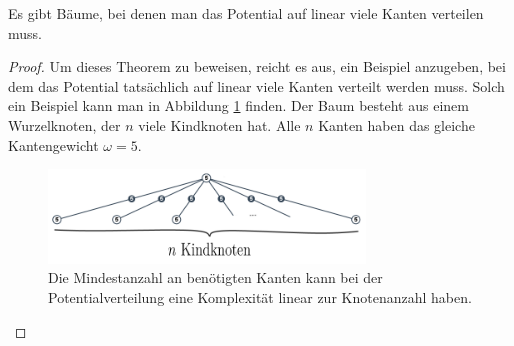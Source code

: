 \begin{theorem}\label{theorem_pot_auf_linear_vielen_kanten}
	Es gibt Bäume, bei denen man das Potential auf linear viele Kanten verteilen muss.
\end{theorem}	
\begin{proof}
	Um dieses Theorem zu beweisen, reicht es aus, ein Beispiel anzugeben, bei dem das Potential tatsächlich auf linear viele Kanten verteilt werden muss. Solch ein Beispiel kann man in Abbildung \ref{abb_bsp_potverteilen} finden. Der Baum besteht aus einem Wurzelknoten, der $n$ viele Kindknoten hat. Alle $n$ Kanten haben das gleiche Kantengewicht $\omega = 5$.
	
		\begin{figure}[htb]
			\includegraphics[width=0.75\textwidth]{bilder/abb_bsp_potverteilen.png} 
			\captionsetup{width=0.75\textwidth}
			\caption{Die Mindestanzahl an benötigten Kanten kann bei der Potentialverteilung eine Komplexität linear zur Knotenanzahl haben.}
			\label{abb_bsp_potverteilen}
		\end{figure}
		

\end{proof}
